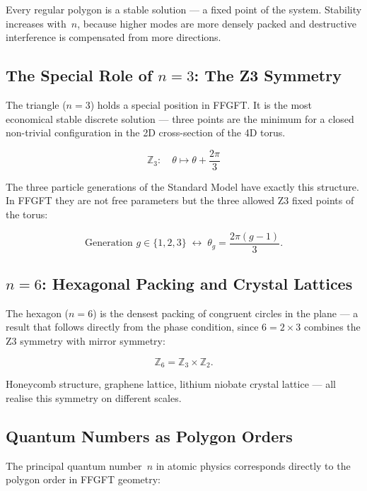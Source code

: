 Every regular polygon is a stable solution — a fixed point of the system.
Stability increases with~$n$, because higher modes are more densely
packed and destructive interference is compensated from more directions.

\subsection{The Special Role of $n = 3$: The Z3 Symmetry}

The triangle ($n=3$) holds a special position in FFGFT. It is
the most economical stable discrete solution — three points are
the minimum for a closed non-trivial configuration in the 2D
cross-section of the 4D torus.

\begin{equation}
  \mathbb{Z}_3: \quad \theta \mapsto \theta + \frac{2\pi}{3}
\end{equation}

The three particle generations of the Standard Model have exactly
this structure. In FFGFT they are not free parameters but the three
allowed Z3 fixed points of the torus:

\begin{equation}
  \text{Generation } g \in \{1, 2, 3\}
  \;\longleftrightarrow\;
  \theta_g = \frac{2\pi(g-1)}{3}.
\end{equation}

\subsection{$n = 6$: Hexagonal Packing and Crystal Lattices}

The hexagon ($n=6$) is the densest packing of congruent circles in
the plane — a result that follows directly from the phase condition,
since $6 = 2 \times 3$ combines the Z3 symmetry with mirror symmetry:

\begin{equation}
  \mathbb{Z}_6 = \mathbb{Z}_3 \times \mathbb{Z}_2.
\end{equation}

Honeycomb structure, graphene lattice, lithium niobate crystal lattice —
all realise this symmetry on different scales.

\subsection{Quantum Numbers as Polygon Orders}

The principal quantum number~$n$ in atomic physics corresponds directly
to the polygon order in FFGFT geometry:

